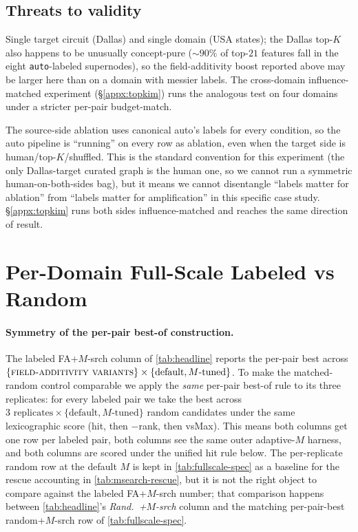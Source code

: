 \subsection{Threats to validity}
Single target circuit (Dallas) and single domain (USA states); the Dallas top-$K$ also happens to be unusually concept-pure ($\sim 90\%$ of top-$21$ features fall in the eight \texttt{auto}-labeled supernodes), so the field-additivity boost reported above may be larger here than on a domain with messier labels. The cross-domain influence-matched experiment (\S\ref{appx:topkim}) runs the analogous test on four domains under a stricter per-pair budget-match.

The source-side ablation uses canonical auto's labels for every condition, so the auto pipeline is ``running'' on every row as ablation, even when the target side is human/top-$K$/shuffled. This is the standard convention for this experiment (the only Dallas-target curated graph is the human one, so we cannot run a symmetric human-on-both-sides bag), but it means we cannot disentangle ``labels matter for ablation'' from ``labels matter for amplification'' in this specific case study. \S\ref{appx:topkim} runs both sides influence-matched and reaches the same direction of result.


\section{Per-Domain Full-Scale Labeled vs Random}
\label{appx:specificity}

\paragraph{Symmetry of the per-pair best-of construction.}
The labeled FA+$M$-srch column of \cref{tab:headline} reports the per-pair best across $\{\textsc{field-additivity variants}\} \times \{\text{default}, M\text{-tuned}\}$. To make the matched-random control comparable we apply the \emph{same} per-pair best-of rule to its three replicates: for every labeled pair we take the best across $3 \text{ replicates} \times \{\text{default}, M\text{-tuned}\}$ random candidates under the same lexicographic score (hit, then $-$rank, then vsMax). This means both columns get one row per labeled pair, both columns see the same outer adaptive-$M$ harness, and both columns are scored under the unified hit rule below. The per-replicate random row at the default $M$ is kept in \cref{tab:fullscale-spec} as a baseline for the rescue accounting in \cref{tab:msearch-rescue}, but it is not the right object to compare against the labeled FA+$M$-srch number; that comparison happens between \cref{tab:headline}'s \emph{Rand.\ +$M$-srch} column and the matching per-pair-best random+$M$-srch row of \cref{tab:fullscale-spec}.


